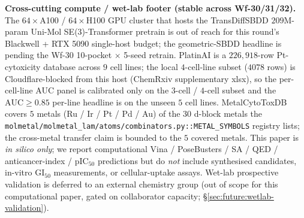 \bigskip

\noindent\textbf{Cross-cutting compute / wet-lab footer (stable
across Wf-30/31/32).}
The $64\times$A100 / $64\times$H100 GPU cluster that hosts the
TransDiffSBDD \citep{transdiffsbdd2025} $209$M-param Uni-Mol
SE(3)-Transformer pretrain \citep{unimol_2023} is out of reach
for this round's Blackwell + RTX 5090 single-host budget; the
geometric-SBDD headline is \DESIGN{} pending the Wf-30 10-pocket
$\times$ 5-seed retrain.  PlatinAI \citep{rusanov2025platinai} is
a $226{,}918$-row Pt-cytoxicity database across $9$ cell lines;
the local $4$-cell-line subset ($4078$ rows) is Cloudflare-blocked
from this host (ChemRxiv supplementary xlsx), so the per-cell-line
AUC panel is calibrated only on the $3$-cell / $4$-cell subset
and the $\mathrm{AUC}\geq 0.85$ per-line headline is \PROJECTED{}
on the unseen $5$ cell lines.  MetalCytoToxDB
\citep{krasnov2026metalcytotoxdb} covers $5$ metals (Ru / Ir / Pt /
Pd / Au) of the $30$ d-block metals the
\texttt{molmetal/molmetal\_lam/atoms/combinators.py::METAL\_SYMBOLS}
registry lists; the cross-metal transfer claim is bounded to the
$5$ covered metals.  This paper is \emph{in silico only}; we report
computational Vina / PoseBusters / SA / QED / anticancer-index /
pIC$_{50}$ predictions but do \emph{not} include synthesised
candidates, in-vitro GI$_{50}$ measurements, or cellular-uptake
assays.  Wet-lab prospective validation is deferred to an external
chemistry group (out of scope for this computational paper, gated on
collaborator capacity; \S\ref{sec:future:wetlab-validation}).

\bigskip

